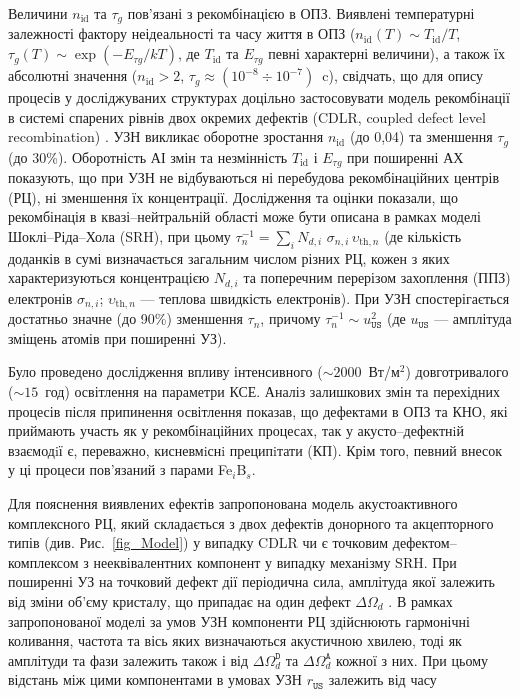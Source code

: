 \documentclass[a5paper,10pt,twoside,openany,article]{memoir} %
\begin{document}
Величини $n_\mathrm{id}$ та $\tau_g$ пов'язані з рекомбінацією в ОПЗ.
Виявлені температурні залежності фактору неідеальності та часу життя в ОПЗ
($n_{\mathrm{id}}(T) \sim T_{\mathrm{id}}/T$,
$\tau_{g}(T)\sim\exp\left(-E_{\tau g}/kT\right)$,
де $T_{\mathrm{id}}$ та $E_{\tau g}$ певні характерні величини),
а також їх абсолютні значення ($n_{\mathrm{id}}>2$, $\tau_{g}\approx(10^{-8}\div10^{-7})$~c),
свідчать, що для опису процесів у досліджуваних структурах доцільно застосовувати модель рекомбінації в системі спарених рівнів двох окремих дефектів (CDLR, coupled defect level recombination) \cite{CDLR:JAP}.
УЗН викликає оборотне зростання $n_\mathrm{id}$  (до 0,04) та зменшення $\tau_g$ (до 30\%).
Оборотність АІ змін та незмінність $T_{\mathrm{id}}$ і $E_{\tau g}$ при поширенні АХ показують, що
при УЗН не відбуваються ні перебудова рекомбінаційних центрів (РЦ), ні зменшення їх концентрації.
Дослідження та оцінки показали, що рекомбінація в квазі--нейтральній області може бути описана в рамках моделі Шоклі--Ріда--Хола (SRH), при цьому $\tau_n^{-1}=\sum_i N_{d,i}\,\,\sigma_{n,i}\,\upsilon_{\mathrm{th},n}$
(де
кількість доданків в сумі визначається загальним числом різних РЦ,
кожен з яких характеризуються концентрацією $N_{d,i}$ та поперечним перерізом захоплення (ППЗ) електронів $\sigma_{n,i}$;
$\upsilon_{\mathrm{th},n}$ --- теплова швидкість електронів).
При УЗН спостерігається достатньо значне (до 90\%) зменшення $\tau_n$, причому
$\tau_{n}^{-1}\sim u_\mathtt{US}^2$ (де $u_\mathtt{US}$ --- амплітуда зміщень атомів при поширенні УЗ).

Було проведено дослідження впливу інтенсивного ($\sim2000$~Вт/м$^2$) довготривалого ($\sim15$~год) освітлення на параметри КСЕ.
Аналіз залишкових змін та перехідних процесів після припинення освітлення показав, що дефектами в ОПЗ та КНО, які приймають участь як у рекомбінаційних процесах, так у акусто--дефектнiй взаємодiї є, переважно, кисневмiснi преципiтати (КП).
Крім того, певний внесок у ці процеси пов'язаний з парами Fe$_i$B$_s$.

Для пояснення виявлених ефектів запропонована модель акустоактивного комплексного РЦ, який складається
з двох дефектів донорного та акцепторного типів (див. Рис.~\ref{fig_Model}) у випадку CDLR  чи є точковим дефектом--комплексом з нееквівалентних компонент у випадку механізму SRH.
При поширенні УЗ на точковий дефект дії періодична сила, амплітуда якої залежить від зміни об'єму кристалу, що припадає на один дефект $\Delta\Omega_d$ \cite{MirzadeJAP2011}.
В рамках запропонованої моделі за умов УЗН компоненти РЦ здійснюють гармонічні коливання, частота та вісь яких визначаються акустичною хвилею, тоді як амплітуди та фази залежить також і від  $\Delta\Omega_d^\mathtt{D}$ та
$\Delta\Omega_d^\mathtt{A}$ кожної з них.
При цьому відстань між цими компонентами в умовах УЗН $r_\mathtt{US}$ залежить від часу
\end{document}
